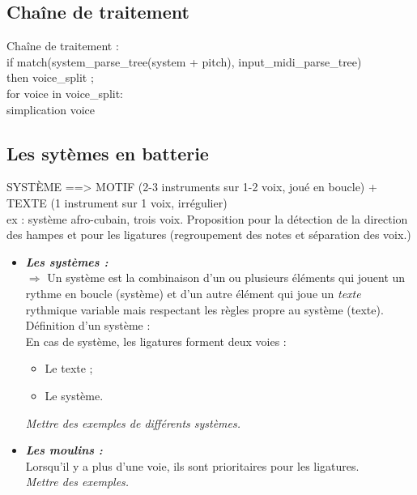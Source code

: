 \subsection{Chaîne de traitement}
Chaîne de traitement :\\
if match(system\_parse\_tree(system + pitch), input\_midi\_parse\_tree)\\
\tab then voice\_split ;\\
\tab for voice in voice\_split:\\
\tab \tab simplication voice

\subsection*{Les sytèmes en batterie}
SYSTÈME ==> MOTIF (2-3 instruments sur 1-2 voix, joué en boucle) + TEXTE (1 instrument sur 1 voix, irrégulier)\\
ex : système afro-cubain, trois voix.
Proposition pour la détection de la direction des hampes et pour les ligatures (regroupement des notes et séparation des voix.)
\begin{itemize}
	\item \textbf{\textit{Les systèmes :}}\\
	$\Rightarrow$ Un système est la combinaison d’un ou plusieurs éléments qui jouent un rythme en boucle (système) et d’un autre élément qui joue un \textit{texte} rythmique variable mais respectant les règles propre au système (texte).\\
	Définition d’un système :\\
	
	En cas de système, les ligatures forment deux voies :
	\begin{itemize}
		\item Le texte ;
		\item Le système.
	\end{itemize}
	\textit{Mettre des exemples de différents systèmes.}
	\item \textbf{\textit{Les moulins :}}\\
	Lorsqu’il y a plus d’une voie, ils sont prioritaires pour les ligatures.\\
	\textit{Mettre des exemples.}\\
\end{itemize}
